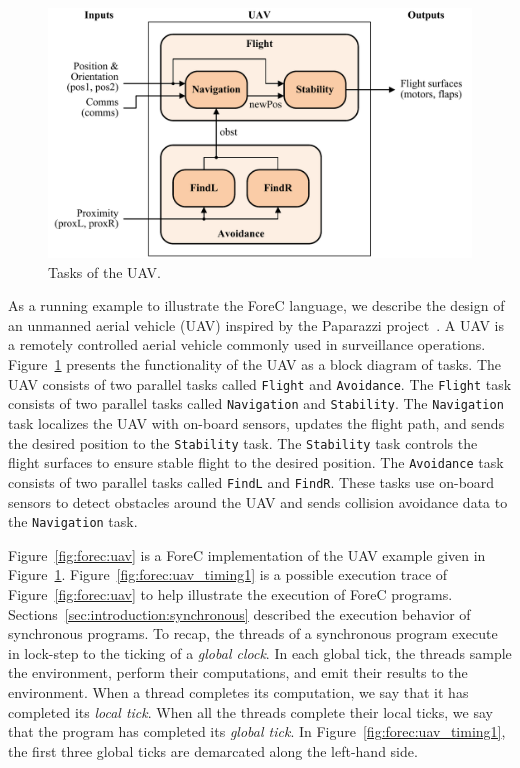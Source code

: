 \begin{figure}
	\centering
	\includegraphics[width=\columnwidth]{images/uav_forec.pdf}

	\caption{Tasks of the UAV.}
	\label{fig:forec:uav_forec}
\end{figure}

As a running example to illustrate the ForeC language, we describe the
design of an unmanned aerial vehicle (UAV) inspired by the
Paparazzi project~\cite{benchmark_papabench}. A UAV is a
remotely controlled aerial vehicle commonly used in
surveillance operations. Figure~\ref{fig:forec:uav_forec} 
presents the functionality of the UAV as a block diagram of tasks. 
The UAV consists of two parallel tasks called \verb$Flight$
and \verb$Avoidance$. The \verb$Flight$ task consists of
two parallel tasks called \verb$Navigation$ and \verb$Stability$.
The \verb$Navigation$ task localizes the UAV with on-board
sensors, updates the flight path, and sends the desired
position to the \verb$Stability$ task. The \verb$Stability$
task controls the flight surfaces to ensure stable flight to
the desired position. The \verb$Avoidance$ task consists of 
two parallel tasks called \verb$FindL$ and \verb$FindR$. 
These tasks use on-board sensors to detect obstacles around 
the UAV and sends collision avoidance data to the 
\verb$Navigation$ task. 

Figure~\ref{fig:forec:uav} is a ForeC implementation of the 
UAV example given in Figure~\ref{fig:forec:uav_forec}.
Figure~\ref{fig:forec:uav_timing1} is a possible execution 
trace of Figure~\ref{fig:forec:uav} to help illustrate the 
execution of ForeC programs. Sections~\ref{sec:introduction:synchronous}
described the execution behavior of synchronous programs. 
To recap, the threads of a synchronous program execute in 
lock-step to the ticking of a \emph{global clock}. In each 
global tick, the threads sample the environment, perform their
computations, and emit their results to the environment.
When a thread completes its computation, we say that it 
has completed its \emph{local tick}. When all the threads complete
their local ticks, we say that the program has completed 
its \emph{global tick}. In Figure~\ref{fig:forec:uav_timing1}, 
the first three global ticks are demarcated along 
the left-hand side. 

